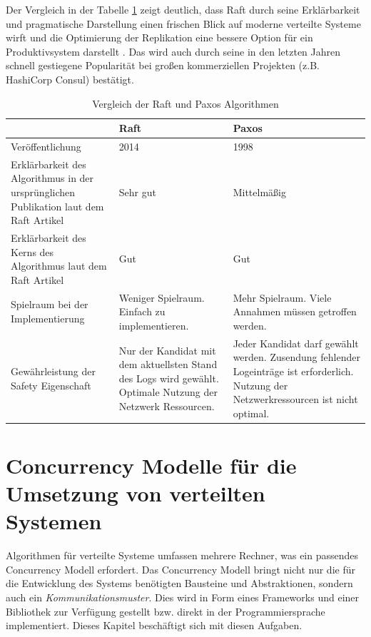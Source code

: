 Der Vergleich in der Tabelle \ref{tab:vergleich} zeigt deutlich, dass Raft durch seine Erklärbarkeit und pragmatische Darstellung einen frischen Blick auf moderne verteilte Systeme wirft und die Optimierung der Replikation eine bessere Option für ein Produktivsystem darstellt \cite{Ongaro14insearch}. Das wird auch durch seine in den letzten Jahren schnell gestiegene Popularität bei großen kommerziellen Projekten (z.B. HashiCorp Consul) bestätigt.

\begin{table} \centering
	\begin{tabular}{|p{5cm}|p{5cm}|p{5cm}|} 
		
		\hline
		&  \textbf{Raft} & \textbf{Paxos}\\
		
		\hline
		Veröffentlichung & 2014 & 1998\\
		
		\hline
		Erklärbarkeit des Algorithmus in der ursprünglichen Publikation laut dem Raft Artikel & Sehr gut & Mittelmäßig\\
		
		\hline
		Erklärbarkeit des Kerns des Algorithmus laut dem Raft Artikel  & Gut & Gut\\
		
		\hline
		Spielraum bei der Implementierung & Weniger Spielraum. Einfach zu implementieren. & Mehr Spielraum. Viele Annahmen müssen getroffen werden.\\
		
		\hline
		Gewährleistung der Safety Eigenschaft & Nur der Kandidat mit dem aktuellsten Stand des Logs wird gewählt. Optimale Nutzung der Netzwerk Ressourcen. & Jeder Kandidat darf gewählt werden. Zusendung fehlender Logeinträge ist erforderlich. Nutzung der Netzwerkressourcen ist nicht optimal.\\
		
		\hline
	\end{tabular}
	\caption{Vergleich der Raft und Paxos Algorithmen}
	\label{tab:vergleich}
\end{table}

\section{Concurrency Modelle für die Umsetzung von verteilten Systemen}

Algorithmen für verteilte Systeme umfassen mehrere Rechner, was ein passendes Concurrency Modell erfordert. Das Concurrency Modell bringt nicht nur die für die Entwicklung des Systems benötigten Bausteine und Abstraktionen, sondern auch ein \textit{Kommunikationsmuster}. Dies wird in Form eines Frameworks und einer Bibliothek zur Verfügung gestellt bzw. direkt in der Programmiersprache implementiert. Dieses Kapitel beschäftigt sich mit diesen Aufgaben.

